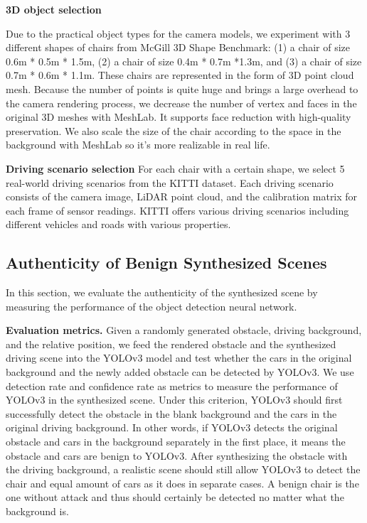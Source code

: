 \textbf{3D object selection}

Due to the practical object types for the camera models, 
we experiment with 3 different shapes of chairs from McGill 3D Shape Benchmark\cite{McGill}:
(1) a chair of size 0.6m * 0.5m * 1.5m, (2) a chair of size 0.4m * 0.7m *1.3m, and (3) a chair of size 0.7m * 0.6m * 1.1m.
These chairs are represented in the form of 3D point cloud mesh. 
Because the number of points is quite huge and brings a large overhead to the camera rendering process,
we decrease the number of vertex and faces in the original 3D meshes with MeshLab\cite{meshlab}.
It supports face reduction with high-quality preservation.
We also scale the size of the chair according to the space in the background with MeshLab so it's more realizable in real life.

\textbf{Driving scenario selection}
For each chair with a certain shape, we select 5 real-world driving scenarios from the KITTI dataset\cite{msf-adv}. 
Each driving scenario consists of the camera image, LiDAR point cloud, and the calibration matrix for each frame of sensor readings.
KITTI offers various driving scenarios including different vehicles and roads with various properties.

\subsection{Authenticity of Benign Synthesized Scenes}
In this section, we evaluate the authenticity of the synthesized scene by measuring the performance of the object detection neural network.

\textbf{Evaluation metrics.} Given a randomly generated obstacle, driving background, and the relative position, we feed the rendered obstacle and the synthesized driving scene into the YOLOv3 model and test whether the cars in the original background and the newly added obstacle can be detected by YOLOv3. 
We use detection rate and confidence rate as metrics to measure the performance of YOLOv3 in the synthesized scene.
Under this criterion, YOLOv3 should first successfully detect the obstacle in the blank background and the cars in the original driving background. 
In other words, if YOLOv3 detects the original obstacle and cars in the background separately in the first place, it means the obstacle and cars are benign to YOLOv3.
After synthesizing the obstacle with the driving background, a realistic scene should still allow YOLOv3 to detect the chair and equal amount of cars as it does in separate cases.
A benign chair is the one without attack and thus should certainly be detected no matter what the background is.

